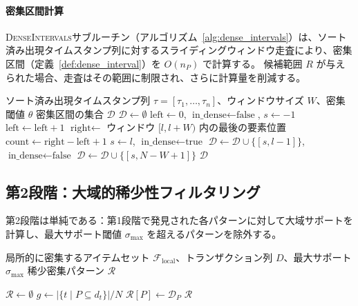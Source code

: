 \paragraph{密集区間計算}
\textsc{DenseIntervals}サブルーチン（アルゴリズム~\ref{alg:dense_intervals}）は、ソート済み出現タイムスタンプ列に対するスライディングウィンドウ走査により、密集区間（定義~\ref{def:dense_interval}）を $O(n_P)$ で計算する。
候補範囲 $R$ が与えられた場合、走査はその範囲に制限され、さらに計算量を削減する。

\begin{algorithm}[t]
\caption{\textsc{DenseIntervals}: 密集区間計算}
\label{alg:dense_intervals}
\begin{algorithmic}[1]
\REQUIRE ソート済み出現タイムスタンプ列 $\tau = [\tau_1, \ldots, \tau_n]$、ウィンドウサイズ $W$、密集閾値 $\theta$
\ENSURE 密集区間の集合 $\mathcal{D}$
\STATE $\mathcal{D} \gets \emptyset$
\STATE $\text{left} \gets 0$, $\text{in\_dense} \gets \text{false}$, $s \gets -1$
        \STATE $\text{left} \gets \text{left} + 1$
    \ENDWHILE
    \STATE $\text{right} \gets$ ウィンドウ $[l, l{+}W)$ 内の最後の要素位置
    \STATE $\text{count} \gets \text{right} - \text{left} + 1$
            \STATE $s \gets l$, $\text{in\_dense} \gets \text{true}$
        \ENDIF
    \ELSE
            \STATE $\mathcal{D} \gets \mathcal{D} \cup \{[s, l{-}1]\}$, $\text{in\_dense} \gets \text{false}$
        \ENDIF
    \ENDIF
\ENDFOR
{}
    \STATE $\mathcal{D} \gets \mathcal{D} \cup \{[s, N{-}W{+}1]\}$
\ENDIF
\RETURN $\mathcal{D}$
\end{algorithmic}
\end{algorithm}

\subsection{第2段階：大域的稀少性フィルタリング}

第2段階は単純である：第1段階で発見された各パターンに対して大域サポートを計算し、最大サポート閾値 $\sigma_{\max}$ を超えるパターンを除外する。

\begin{algorithm}[t]
\caption{第2段階：大域的稀少性フィルタリング}
\label{alg:phase2}
\begin{algorithmic}[1]
\REQUIRE 局所的に密集するアイテムセット $\mathcal{F}_{\text{local}}$、トランザクション列 $D$、最大サポート $\sigma_{\max}$
\ENSURE 稀少密集パターン $\mathcal{R}$

\STATE $\mathcal{R} \gets \emptyset$
    \STATE $g \gets |\{t \mid P \subseteq d_t\}| / N$
        \STATE $\mathcal{R}[P] \gets \mathcal{D}_P$
    \ENDIF
\ENDFOR
\RETURN $\mathcal{R}$
\end{algorithmic}
\end{algorithm}

